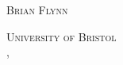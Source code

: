 \begin{titlepage}
{    }%
    \HRule %
    \vspace{2cm}
    
    \textsc{\Huge Brian Flynn}%
    
    \vspace{3cm}
    \textsc{
        \LARGE University of Bristol \\    
    }
    \vspace{1cm}
    {\Large \monthname, \the\year}\\[1cm] %
    
    \end{titlepage}